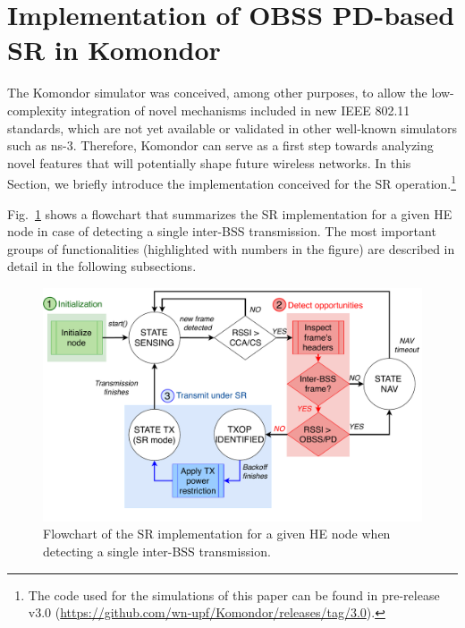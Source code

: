 \documentclass[conference]{IEEEtran}
\begin{document}
	\section{Implementation of OBSS PD-based SR in Komondor}
	\label{section:komondor}
	
	The Komondor simulator was conceived, among other purposes, to allow the low-complexity integration of novel mechanisms included in new IEEE 802.11 standards, which are not yet available or validated in other well-known simulators such as ns-3. Therefore, Komondor can serve as a first step towards analyzing novel features that will potentially shape future wireless networks. In this Section, we briefly introduce the implementation conceived for the SR operation.\footnote{The code used for the simulations of this paper can be found in pre-release v3.0 (\url{https://github.com/wn-upf/Komondor/releases/tag/3.0}).}
	
	Fig.~\ref{fig:implementation_overview} shows a flowchart that summarizes the SR implementation for a given HE node in case of detecting a single inter-BSS transmission. The most important groups of functionalities (highlighted with numbers in the figure) are described in detail in the following subsections.
	
	\begin{figure}[h!!!!]
		\centering
		\includegraphics[width=0.95\columnwidth]{implementation_overview}
		\caption{Flowchart of the SR implementation for a given HE node when detecting a single inter-BSS transmission.}
		\label{fig:implementation_overview}
	\end{figure}
	
\end{document}
